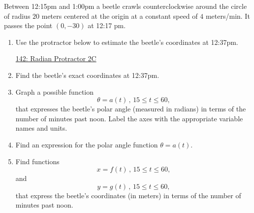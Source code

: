 \documentclass{ximera}
\begin{document}
\begin{question}  \label{Q9dfrtfg94tf4}

Between 12:15pm and 1:00pm a beetle crawls counterclockwise around the circle of radius $20$ meters centered at the origin at a constant speed of $4$ meters/min. It passes the point $(0,-30)$ at 12:17 pm.

\begin{enumerate}

\item Use the protractor below to estimate the beetle's coordinates at 12:37pm. 

\begin{onlineOnly}
    \begin{center}
\end{center}
\end{onlineOnly}

\href{https://www.desmos.com/calculator/lbkveixdno}{142: Radian Protractor 2C}

\item Find the beetle's exact coordinates at 12:37pm.

\item Graph a possible function
\[
 \theta = a(t) \, , \, 15\leq t \leq 60 ,
\]
that expresses the beetle's polar angle (measured in radians) in terms of the number of minutes past noon. Label the axes with the appropriate variable names and units.

\item Find an expression for the polar angle function $\theta = a(t)$.

\item Find functions
\[
     x = f(t) \, , \, 15 \leq t \leq 60,
\]
and
\[
     y = g(t) \, , \, 15 \leq t \leq 60,
\]
that express the beetle's coordinates (in meters) in terms of the number of minutes past noon.
\end{enumerate}

\end{question}
\end{document}
